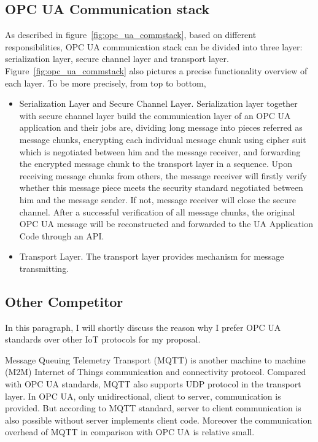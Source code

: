 \subsection{OPC UA Communication stack}
As described in figure~\ref{fig:opc_ua_commstack}, based on different responsibilities, OPC UA communication stack can be divided into three layer: serialization layer, secure channel layer and transport layer.  Figure~\ref{fig:opc_ua_commstack} also pictures a precise functionality overview of each layer. To be more precisely, from top to bottom,
\begin{itemize}
\item{Serialization Layer} and {Secure Channel Layer}.  Serialization layer together with secure channel layer build the communication layer of an OPC UA application and their jobs are, dividing long message into pieces referred as message chunks, encrypting each individual message chunk using cipher suit which is negotiated between him and the message receiver, and forwarding the encrypted message chunk to the transport layer in a sequence. Upon receiving message chunks from others, the message receiver will firstly verify whether this message piece meets the security standard negotiated between him and the message sender. If not, message receiver will close the secure channel. After a successful verification of all message chunks, the original OPC UA message will be reconstructed and forwarded to the UA Application Code through an API. 

\item{Transport Layer}. The transport layer provides mechanism for message transmitting.
\end{itemize}

\subsection{Other Competitor}
In this paragraph, I will shortly discuss the reason why I prefer OPC UA standards over other IoT protocols for my proposal.

Message Queuing Telemetry Transport (MQTT) \cite{Ref3} is another machine to machine (M2M) Internet of Things communication and connectivity protocol. Compared with OPC UA standards, MQTT also supports UDP protocol in the transport layer. In OPC UA, only unidirectional, client to server, communication is provided. But  according to MQTT standard, server to client communication is also possible without server implements client code. Moreover the communication overhead of MQTT in comparison with OPC UA is relative small. 


